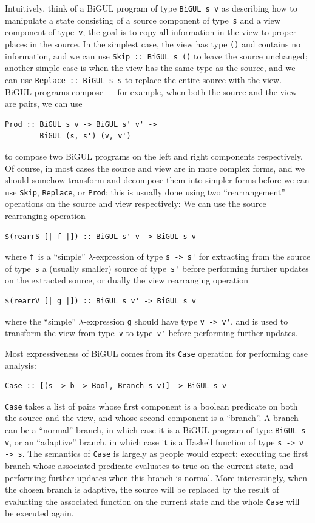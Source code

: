 \documentclass[preprint,numbers]{sigplanconf}
\begin{document}
Intuitively, think of a BiGUL program of type \lstinline{BiGUL s v} as describing how to manipulate a state consisting of a source component of type~\lstinline{s} and a view component of type~\lstinline{v}; the goal is to copy all information in the view to proper places in the source.
In the simplest case, the view has type \lstinline{()} and contains no information, and we can use \lstinline{Skip :: BiGUL s ()} to leave the source unchanged;
another simple case is when the view has the same type as the source, and we can use \lstinline{Replace :: BiGUL s s} to replace the entire source with the view.
BiGUL programs compose --- for example, when both the source and the view are pairs, we can use
\begin{lstlisting}
Prod :: BiGUL s v -> BiGUL s' v' ->
        BiGUL (s, s') (v, v')
\end{lstlisting}
to compose two BiGUL programs on the left and right components respectively.
Of course, in most cases the source and view are in more complex forms, and we should somehow transform and decompose them into simpler forms before we can use \lstinline{Skip}, \lstinline{Replace}, or \lstinline{Prod}; this is usually done using two ``rearrangement'' operations on the source and view respectively:
We can use the source rearranging operation
\begin{lstlisting}
$(rearrS [| f |]) :: BiGUL s' v -> BiGUL s v
\end{lstlisting}
where \lstinline{f}~is a ``simple'' $\lambda$-expression of type \lstinline{s -> s'} for extracting from the source of type~\lstinline{s} a (usually smaller) source of type~\lstinline{s'} before performing further updates on the extracted source, or dually the view rearranging operation
\begin{lstlisting}
$(rearrV [| g |]) :: BiGUL s v' -> BiGUL s v
\end{lstlisting}
where the ``simple'' $\lambda$-expression \lstinline{g} should have type \lstinline{v -> v'}, and is used to transform the view from type~\lstinline{v} to type~\lstinline{v'} before performing further updates.

Most expressiveness of BiGUL comes from its \lstinline{Case} operation for performing case analysis:
\begin{lstlisting}
Case :: [(s -> b -> Bool, Branch s v)] -> BiGUL s v
\end{lstlisting}
\lstinline{Case} takes a list of pairs whose first component is a boolean predicate on both the source and the view, and whose second component is a ``branch''.
A branch can be a ``normal'' branch, in which case it is a BiGUL program of type \lstinline{BiGUL s v}, or an ``adaptive'' branch, in which case it is a Haskell function of type \lstinline{s -> v -> s}.
The semantics of \lstinline{Case} is largely as people would expect: executing the first branch whose associated predicate evaluates to true on the current state, and performing further updates when this branch is normal.
More interestingly, when the chosen branch is adaptive, the source will be replaced by the result of evaluating the associated function on the current state and the whole \lstinline{Case} will be executed again.
\end{document}

